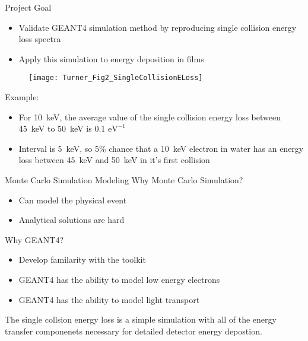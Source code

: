 \documentclass[compress]{beamer}
\begin{document}
\begin{frame}{Project Goal}
  \centering
  \begin{itemize}
    \item Validate GEANT4 simulation method by reproducing single collision energy loss spectra
    \item Apply this simulation to energy deposition in films
  \end{itemize}
  \begin{figure}
    \texttt{[image: Turner\_Fig2\_SingleCollisionELoss]}
  \end{figure}
  \flushleft
  \small
  Example:
  \begin{itemize}
    \tiny
    \item For \SI{10}{\keV}, the average value of the single collision energy loss between \SI{45}{\keV} to \SI{50}{\keV} is 0.1 $\text{eV}^{-1}$
    \item Interval is \SI{5}{\keV}, so 5\% chance that a \SI{10}{\keV} electron in water has an energy loss between \SI{45}{\keV} and \SI{50}{\keV} in it's first collision
  \end{itemize}
\end{frame}
\begin{frame}{Monte Carlo Simulation Modeling}
Why Monte Carlo Simulation?
\begin{itemize}
  \item Can model the physical event
  \item Analytical solutions are hard
\end{itemize}
Why GEANT4?
\begin{itemize}
  \item Develop familarity with the toolkit
  \item GEANT4 has the ability to model low energy electrons
  \item GEANT4 has the ability to model light transport
\end{itemize}
\centering
The single collsion energy loss is a simple simulation with all of the energy transfer componenets necessary for detailed detector energy depostion.
\end{frame}
\end{document}
